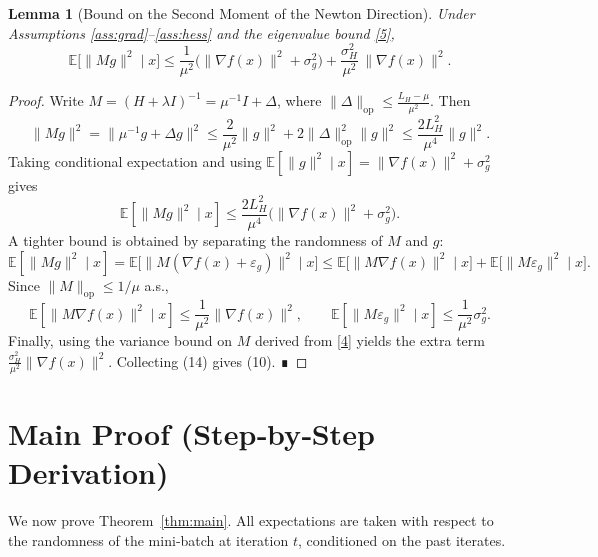 \documentclass{article}
\newcommand{\E}{\mathbb{E}}
\newtheorem{lemma}{Lemma}
\begin{document}
\begin{lemma}[Bound on the Second Moment of the Newton Direction]\label{lem:second}
Under Assumptions \ref{ass:grad}–\ref{ass:hess} and the eigenvalue bound \eqref{5},
\[
\E\!\big[\|M g\|^{2}\mid x\big]
\le
\frac{1}{\mu^{2}}\Big(\|\nabla f(x)\|^{2}+\sigma_{g}^{2}\Big)
+\frac{\sigma_{H}^{2}}{\mu^{2}}\,\|\nabla f(x)\|^{2}.
\tag{10}
\]
\end{lemma}
\begin{proof}
Write $M=(H+\lambda I)^{-1}= \mu^{-1}I + \Delta$, where $\|\Delta\|_{\mathrm{op}}\le \frac{L_H-\mu}{\mu^{2}}$.  
Then
\[
\|Mg\|^{2}
= \big\|\mu^{-1}g+\Delta g\big\|^{2}
\le \frac{2}{\mu^{2}}\|g\|^{2}+2\|\Delta\|_{\mathrm{op}}^{2}\|g\|^{2}
\le \frac{2L_H^{2}}{\mu^{4}}\|g\|^{2}.
\tag{11}
\]
Taking conditional expectation and using $\E[\|g\|^{2}\mid x]=\|\nabla f(x)\|^{2}+\sigma_{g}^{2}$ gives
\[
\E[\|Mg\|^{2}\mid x]\le \frac{2L_H^{2}}{\mu^{4}}\big(\|\nabla f(x)\|^{2}+\sigma_{g}^{2}\big).
\tag{12}
\]
A tighter bound is obtained by separating the randomness of $M$ and $g$:
\[
\E[\|Mg\|^{2}\mid x]
= \E\!\big[\|M(\nabla f(x)+\varepsilon_g)\|^{2}\mid x\big]
\le \E\!\big[\|M\nabla f(x)\|^{2}\mid x\big]
    +\E\!\big[\|M\varepsilon_g\|^{2}\mid x\big].
\tag{13}
\]
Since $\|M\|_{\mathrm{op}}\le 1/\mu$ a.s.,
\[
\E[\|M\nabla f(x)\|^{2}\mid x]\le\frac{1}{\mu^{2}}\|\nabla f(x)\|^{2},
\qquad
\E[\|M\varepsilon_g\|^{2}\mid x]\le\frac{1}{\mu^{2}}\sigma_{g}^{2}.
\tag{14}
\]
Finally, using the variance bound on $M$ derived from \eqref{4} yields the extra term
$\frac{\sigma_{H}^{2}}{\mu^{2}}\|\nabla f(x)\|^{2}$.  Collecting (14) gives (10). ∎
\end{proof}

\section*{Main Proof (Step‑by‑Step Derivation)}
We now prove Theorem~\ref{thm:main}.  All expectations are taken with respect to the randomness of the mini‑batch at iteration $t$, conditioned on the past iterates.
\end{document}
